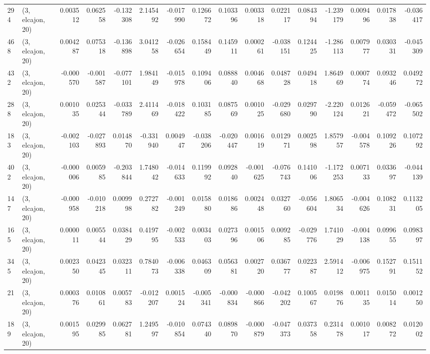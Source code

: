 \begin{tabular}{llrrrrrrrrrrrrrr}
294 &  (3, elcajon, 20) &   0.003512 &  0.062558 & -0.132308 &    2.145492 & -0.017990 &   0.126672 &  0.103396 &  0.003318 &  0.022117 &  0.084394 &   -1.239179 &  0.009496 &  0.017838 & -0.036417 \\
468 &  (3, elcajon, 20) &   0.004287 &  0.075318 & -0.136898 &    3.041258 & -0.026654 &   0.158449 &  0.145911 &  0.000261 & -0.038151 &  0.124425 &   -1.286113 &  0.007977 &  0.030331 & -0.045309 \\
432 &  (3, elcajon, 20) &  -0.000570 & -0.001587 & -0.077101 &    1.984149 & -0.015978 &   0.109406 &  0.088840 &  0.004668 &  0.048728 &  0.049418 &    1.864969 &  0.000774 &  0.093246 &  0.049272 \\
288 &  (3, elcajon, 20) &   0.001035 &  0.025344 & -0.033789 &    2.411469 & -0.018422 &   0.103185 &  0.087569 &  0.001025 & -0.029680 &  0.029790 &   -2.220124 &  0.012621 & -0.059472 & -0.065502 \\
183 &  (3, elcajon, 20) &  -0.002103 & -0.027893 &  0.014870 &   -0.331940 &  0.004947 &  -0.038206 & -0.020447 &  0.001619 &  0.012971 &  0.002598 &    1.857957 & -0.004578 &  0.109226 &  0.107292 \\
402 &  (3, elcajon, 20) &  -0.000006 &  0.005985 & -0.203844 &    1.748042 & -0.014633 &   0.119992 &  0.092840 & -0.001625 & -0.076743 &  0.141006 &   -1.172253 &  0.007133 &  0.033697 & -0.044139 \\
147 &  (3, elcajon, 20) &  -0.000958 & -0.010218 &  0.009998 &    0.272782 & -0.001249 &   0.015880 &  0.018686 &  0.002448 &  0.032760 & -0.056604 &    1.806534 & -0.004626 &  0.108231 &  0.113205 \\
165 &  (3, elcajon, 20) &   0.000011 &  0.005544 &  0.038429 &    0.419795 & -0.002533 &   0.003403 &  0.027396 &  0.001506 &  0.009285 & -0.029776 &    1.741029 & -0.004138 &  0.099655 &  0.098397 \\
345 &  (3, elcajon, 20) &   0.002350 &  0.042345 &  0.032311 &    0.784073 & -0.006338 &   0.046309 &  0.056381 &  0.002720 &  0.036777 &  0.022387 &    2.591412 & -0.006975 &  0.152791 &  0.151152 \\
21  &  (3, elcajon, 20) &   0.000376 &  0.010861 &  0.005783 &   -0.012207 &  0.001524 &  -0.005341 & -0.000834 & -0.000866 & -0.042202 &  0.100567 &    0.019876 &  0.001135 &  0.015014 &  0.001250 \\
189 &  (3, elcajon, 20) &   0.001595 &  0.029985 &  0.062781 &    1.249597 & -0.010854 &   0.074340 &  0.089870 & -0.000879 & -0.047373 &  0.037358 &    0.231478 &  0.001017 &  0.008272 &  0.012002 \\

\end{tabular}
